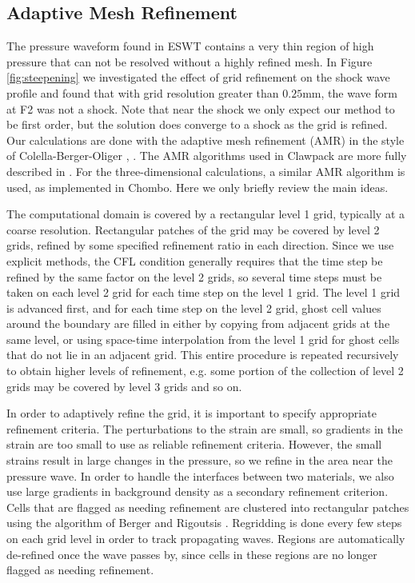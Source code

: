 \documentclass{article}
\begin{document}
\subsection{Adaptive Mesh Refinement}
\label{sec:amr}
The pressure waveform found in ESWT contains a very thin region of high pressure that can not be 
resolved without a highly refined mesh.  In Figure \ref{fig:steepening} we investigated the effect of grid 
refinement on the shock wave profile and found that with grid resolution greater than $0.25$mm, the 
wave form at F2 was not a shock.  Note that near the shock we only expect our method to be first order, but the solution does converge to a shock as the grid is refined.  Our calculations are done with the adaptive mesh refinement (AMR) in the style of Colella-Berger-Oliger \cite{mjb-col:amr}, \cite{mjb-ol:amr}.  
The AMR algorithms used in Clawpack are more fully described in \cite{mjb-rjl:amrclaw}.  For the three-dimensional calculations, a similar AMR algorithm is used, as implemented in Chombo.  Here we only briefly review the main ideas.

The computational domain is covered by a rectangular level 1 grid, typically at a coarse resolution.  Rectangular patches of the grid may be  covered by level 2 grids, refined by some specified refinement ratio in each direction.  
Since we use explicit methods, the CFL condition generally requires that the time step be refined by the same factor on the level 2 grids, so several time steps must be taken on each level 2 grid for each time step on the level 1 grid.  The level 1 grid is advanced first, and for each time step on the level 2 grid, ghost cell values around the boundary are filled in either by copying from adjacent grids at the same level, or using space-time interpolation from the level 1 grid for ghost cells that do not lie in an adjacent grid.  This entire procedure is repeated recursively to obtain higher levels of refinement, e.g. some portion of the collection of level 2 grids may be covered by level 3 grids and so on.

In order to adaptively refine the grid, it is important to specify appropriate refinement criteria.  The perturbations to the strain are small, so gradients in the strain are too small to use as reliable refinement criteria.  However, the small strains result in large changes in the pressure, so we refine in the area near the pressure wave.  In order to handle the interfaces between two materials, we also use large gradients in background density as a secondary refinement criterion.  
Cells that are flagged as needing refinement are clustered into rectangular patches using the algorithm of Berger and Rigoutsis \cite{mjb-rig:cluster}.  Regridding is done every few steps on each grid level in order to track propagating waves.  
Regions are automatically de-refined once the wave passes by, since cells in these regions are no longer flagged as needing refinement.  
\end{document}
